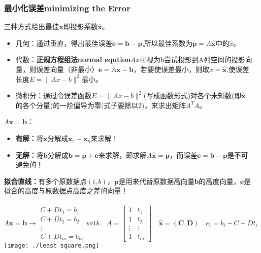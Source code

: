     \subsubsection{最小化误差minimizing the Error}
    三种方式给出最佳$\bm{x}$即投影系数$\hat{\bm{x}}$。
    \begin{itemize}
        \item 几何：通过垂直，得出最佳误差$\bm{e}=\bm{b}-\bm{p}$,所以最佳系数为$\boldsymbol{p} = A \widehat{\boldsymbol{x}}$中的$\hat{x}$。
        \item 代数：\textbf{正规方程组法normal eqution}$A x$可视为b尝试投影到A列空间的投影向量，则误差向量（非最小）$\bm{e} = A\bm{x} - \bm{b}$，若要使误差最小，则取$x= \widehat{\bm{x}}$,使误差长度$E=\|A x-b\|^{2}$最小。
        \item 微积分：通过令误差函数$E=\|A x-b\|^{2}$(写成函数形式)对各个未知数(即$\widehat{\bm{x}}$的各个分量)的一阶偏导为零(式子要除以2)，来求出矩阵$A^T A$。
    \end{itemize}
    $A\bm{x}=\bm{b}$：
    \begin{itemize}
        \item \textbf{有解：}将$\bm{x}$分解成$\boldsymbol{x}_{r}+\boldsymbol{x}_{n}$来求解！
        \item \textbf{无解：}将$\bm{b}$分解成$\bm{b=p+e}$来求解，即求解$A \widehat{\boldsymbol{x}}=\boldsymbol{p}$，而误差$\bm{e}=\boldsymbol{b}-\boldsymbol{p}$是不可避免的！
    \end{itemize}
    \textbf{拟合直线：}有多个原数据点$(t,b)$，$\bm{p}$是用来代替原数据高向量$\bm{b}$的高度向量，$\bm{e}$是拟合的高度与原数据点高度之差的向量！\\
    \\
    $$
    A \boldsymbol{x}=\boldsymbol{b}
    \rightarrow
    \begin{array}{l}{C+D t_{1}=b_{1}} \\ {C+D t_{2}=b_{2}} \\ {\vdots} \\ {C+D t_{m}=b_{m}}\end{array}
    with\quad A=\left[\begin{array}{cc}{1} & {t_{1}} \\ {1} & {t_{2}} \\ {\vdots} & {\vdots} \\ {1} & {t_{m}}\end{array}\right]
    \quad \widehat{\boldsymbol{x}}=(\boldsymbol{C}, \boldsymbol{D}) \quad e_{i}=b_{i}-C-D t_{i}
    $$
    \texttt{[image: ./least square.png]}
